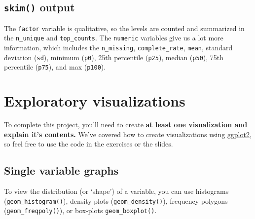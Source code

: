 \documentclass[letterpaper,9pt,twoside,]{pinp}
\begin{document}
\hypertarget{skim-output}{%
\subsection{\texorpdfstring{\texttt{skim()}
output}{skim() output}}\label{skim-output}}

The \texttt{factor} variable is qualitative, so the levels are counted
and summarized in the \texttt{n\_unique} and \texttt{top\_counts}. The
\texttt{numeric} variables give us a lot more information, which
includes the \texttt{n\_missing}, \texttt{complete\_rate},
\texttt{mean}, standard deviation (\texttt{sd}), minimum (\texttt{p0}),
25th percentile (\texttt{p25}), median (\texttt{p50}), 75th percentile
(\texttt{p75}), and max (\texttt{p100}).

\hypertarget{exploratory-visualizations}{%
\section{Exploratory visualizations}\label{exploratory-visualizations}}

To complete this project, you'll need to create \textbf{at least one
visualization and explain it's contents.} We've covered how to create
visualizations using \href{https://ggplot2.tidyverse.org/}{ggplot2}, so
feel free to use the code in the exercises or the slides.

\hypertarget{single-variable-graphs}{%
\subsection{Single variable graphs}\label{single-variable-graphs}}

To view the distribution (or `shape') of a variable, you can use
histograms (\texttt{geom\_histogram()}), density plots
(\texttt{geom\_density()}), frequency polygons
(\texttt{geom\_freqpoly()}), or box-plots \texttt{geom\_boxplot()}.

\begin{Shaded}
\begin{Highlighting}[]
\OtherTok{\textless{}{-}} \NormalTok{(} \NormalTok{, }
                   \NormalTok{)}
\SpecialCharTok{\%\textgreater{}\%} 
  \NormalTok{(}\NormalTok{(}\SpecialCharTok{+} 
    \NormalTok{() }\SpecialCharTok{+} 
\end{Highlighting}
\end{Shaded}
\end{document}
